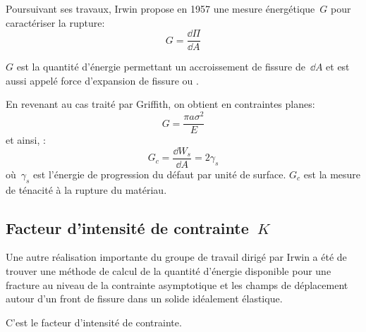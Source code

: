 \medskip
Poursuivant ses travaux, Irwin propose en 1957 une mesure énergétique~$G$ pour caractériser la rupture:
\begin{equation} G = \dfrac{\dd\Pi}{\dd A} \end{equation}

$G$ est la quantité d'énergie permettant un accroissement de fissure de~$\dd A$ et est aussi appelé force d'expansion de fissure ou .

\medskip
En revenant au cas traité par Griffith, on obtient en contraintes planes:
\begin{equation} G = \dfrac{\pi a\sigma^2}{E} \end{equation}
et ainsi, :
\begin{equation} G_c = \dfrac{\dd W_s}{\dd A}=2\gamma_s \end{equation}
où~$\gamma_s$ est l'énergie de progression du défaut par unité de surface.
$G_c$ est la mesure de ténacité à la rupture du matériau.


\medskip
\subsection{Facteur d'intensité de contrainte~$K$}

\medskip
\begin{histoire}%
Une autre réalisation importante du groupe de travail dirigé par Irwin a été de trouver une méthode de calcul de la quantité d'énergie disponible pour une fracture au niveau de la contrainte asymptotique et les champs de déplacement autour d'un front de fissure dans un solide idéalement élastique.

C'est le facteur d'intensité de contrainte.
\end{histoire}

